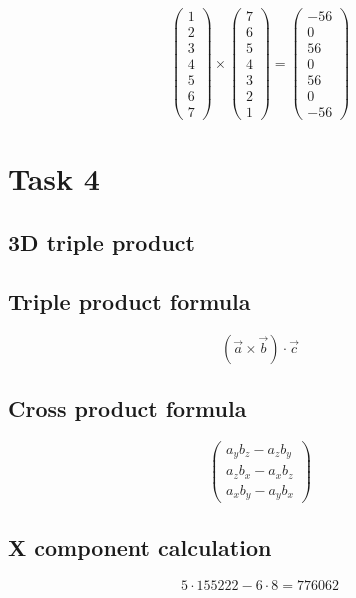 \documentclass{article}
\begin{document}
\[
\begin{pmatrix}1 \\ 2 \\ 3 \\ 4 \\ 5 \\ 6 \\ 7\end{pmatrix} \times \begin{pmatrix}7 \\ 6 \\ 5 \\ 4 \\ 3 \\ 2 \\ 1\end{pmatrix} = \begin{pmatrix}-56 \\ 0 \\ 56 \\ 0 \\ 56 \\ 0 \\ -56\end{pmatrix}
\]
\bigskip

\hrulefill
\bigskip

\section*{Task 4}

\subsection*{3D triple product}
\subsection*{ \vspace{1em} Triple product formula}
\[
(\vec{a} \times \vec{b}) \cdot \vec{c}
\]
\subsection*{ \vspace{1em} Cross product formula}
\[
\begin{pmatrix}
a_y b_z - a_z b_y \\ 
a_z b_x - a_x b_z \\ 
a_x b_y - a_y b_x
\end{pmatrix}
\]
\subsection*{ \vspace{1em} X component calculation}
\[
5 \cdot 155222 - 6 \cdot 8 = 776062
\]
\end{document}
